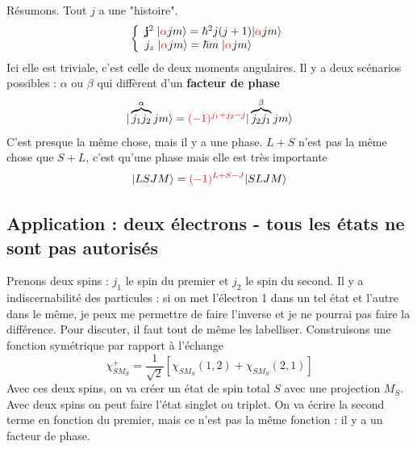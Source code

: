 Résumons. Tout $j$ a une "histoire". 
\begin{equation}
\left\{ \begin{array}{l}
{\bf j}^2 \; \vert  {\color{red}  \alpha} j m \rangle  
=  \hbar^2 j(j + 1) \vert  {\color{red}  \alpha}  j m \rangle \\
j_{z} \; \vert  {\color{red}  \alpha}  j m \rangle  
=  \hbar m  \; \vert {\color{red}  \alpha}   j m \rangle  
 \end{array} \right.
\end{equation}
Ici elle est triviale, c'est celle de deux moments angulaires. Il y a deux scénarios possibles : $\alpha$ ou $\beta$ qui diffèrent d'un \textbf{facteur de phase}
\begin{equation}
\vert \overbrace{j_1 j_2}^{\alpha} j m \rangle = 
{\color{red} 
(-1)^{j_1 + j_2 -j}    }
\vert \overbrace{j_2 j_1}^{\beta}j m \rangle
\end{equation}
C'est presque la même chose, mais il y a une phase. $L+S$ n'est pas la même chose que $S+L$, c'est
qu'une phase mais elle est très importante
\begin{equation}
\vert L S J M \rangle = 
{\color{red}  (-1)^{L + S - J}  }
 \vert S L J M \rangle
\end{equation}


\subsection{Application : deux électrons - tous les états ne sont pas autorisés}
Prenons deux spins : $j_1$ le spin du premier et $j_2$ le spin du second. Il y a indiscernabilité
des particules : si on met l'électron 1 dans un tel état et l'autre dans le même, je peux me
permettre de faire l'inverse et je ne pourrai pas faire la différence. Pour discuter, il faut tout
de même les labelliser. Construisons une fonction symétrique par rapport à l'échange
\begin{equation}
\chi^+_{SM_S} = \frac{1}{\sqrt{2}} [ \chi_{SM_S} (1,2) + \chi_{SM_S} (2,1) ]
\end{equation}
Avec ces deux spins, on va créer un état de spin total $S$ avec une projection $M_S$. Avec 
deux spins on peut faire l'état singlet ou triplet. On va écrire la second terme en fonction du premier, mais ce n'est pas la même fonction : il y a un facteur de phase. \\

